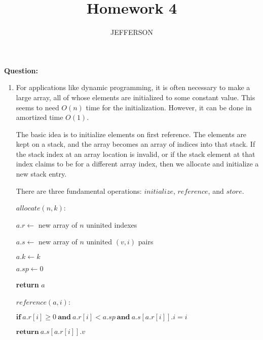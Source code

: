 \documentclass[11pt,letterpaper,oneside]{article}
\title{Homework 4}
\author{JEFFERSON}
\date{}
\begin{document}
\maketitle


\noindent\textbf{Question:}

\vspace{-1em}
\begin{enumerate}
  \itemsep1pt \parskip0pt 
  \item For applications like dynamic programming, it is often necessary to make a large array, all of whose elements are initialized to some constant value. This seems to need $O(n)$ time for the initialization. However, it can be done in amortized time $O(1)$.

The basic idea is to initialize elements on first reference. The elements are kept on a stack, and the array becomes an array of indices into that stack. If the stack index at an array location is invalid, or if the stack element at that index claims to be for a different array index, then we allocate and initialize a new stack entry.

There are three fundamental operations: $initialize$, $reference$, and $store$.

\vspace{1em}\hspace{2em} $allocate(n, k)$:

\hspace{3em}    $a.r \leftarrow$ new array of $n$ uninited indexes

\hspace{3em}    $a.s \leftarrow$ new array of $n$ uninited $(v, i)$ pairs

\hspace{3em}    $a.k \leftarrow k$
 
\hspace{3em}    $a.sp \leftarrow 0$ 

\hspace{3em}    \textbf{return} $a$

\null

\vspace{1em}\hspace{2em} $reference(a, i)$:

\hspace{3em}    $\textbf{if}\ a.r[i] \geq 0\ \textbf{and}\ a.r[i] < a.sp\ \textbf{and}\ a.s[a.r[i]].i = i$

\hspace{4em}        $\textbf{return}\ a.s[a.r[i]].v$


\end{enumerate}
\end{document}

